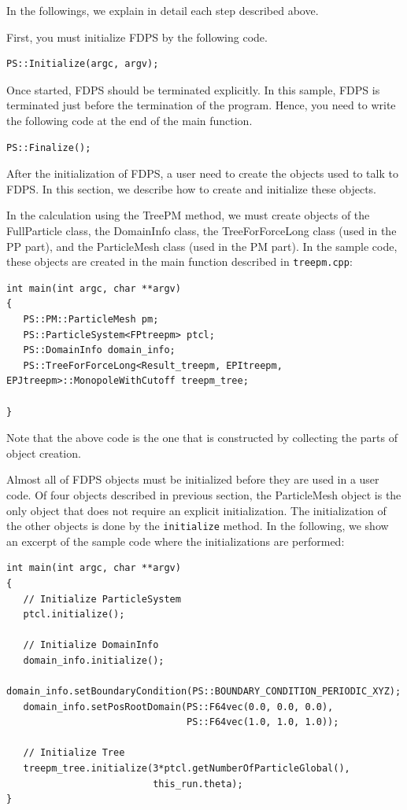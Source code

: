 In the followings, we explain in detail each step described above.

First, you must initialize FDPS by the following code.
\begin{lstlisting}[caption=Initialization of FDPS]
PS::Initialize(argc, argv);
\end{lstlisting}

Once started, FDPS should be terminated explicitly. In this sample, FDPS is terminated just before the termination of the program. Hence, you need to write the following code at the end of the main function.
\begin{lstlisting}[caption=Termination of FDPS]
PS::Finalize();
\end{lstlisting}

After the initialization of FDPS, a user need to create the objects used to talk to FDPS. In this section, we describe how to create and initialize these objects.

In the calculation using the TreePM method, we must create objects of the \textsf{FullParticle} class, the \textsf{DomainInfo} class, the \textsf{TreeForForceLong} class (used in the PP part), and the \textsf{ParticleMesh} class (used in the PM part). In the sample code, these objects are created in the main function described in \texttt{treepm.cpp}:
\begin{lstlisting}[caption=Creation of FDPS objects]
int main(int argc, char **argv)
{
   PS::PM::ParticleMesh pm;
   PS::ParticleSystem<FPtreepm> ptcl;
   PS::DomainInfo domain_info;
   PS::TreeForForceLong<Result_treepm, EPItreepm, EPJtreepm>::MonopoleWithCutoff treepm_tree;

}
\end{lstlisting}
Note that the above code is the one that is constructed by collecting the parts of object creation.

Almost all of FDPS objects must be initialized before they are used in a user code. Of four objects described in previous section, the \textsf{ParticleMesh} object is the only object that does not require an explicit initialization. The initialization of the other objects is done by the \texttt{initialize} method. In the following, we show an excerpt of the sample code where the initializations are performed:
\begin{lstlisting}[caption=Initialization of FDPS objects]
int main(int argc, char **argv)
{
   // Initialize ParticleSystem
   ptcl.initialize();

   // Initialize DomainInfo
   domain_info.initialize();  
   domain_info.setBoundaryCondition(PS::BOUNDARY_CONDITION_PERIODIC_XYZ);
   domain_info.setPosRootDomain(PS::F64vec(0.0, 0.0, 0.0), 
                                PS::F64vec(1.0, 1.0, 1.0));
                                
   // Initialize Tree
   treepm_tree.initialize(3*ptcl.getNumberOfParticleGlobal(),
                          this_run.theta);
}
\end{lstlisting}

